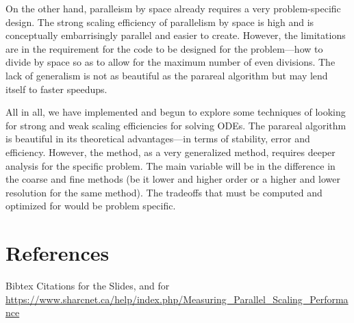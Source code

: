 \documentclass[letterpaper,twocolumn,11pt]{article}
\begin{document}
On the other hand, paralleism by space already requires a very problem-specific
design. The strong scaling efficiency of parallelism by space is high and is
conceptually embarrisingly parallel and easier to create. However, the
limitations are in the requirement for the code to be designed for the
problem---how to divide by space so as to allow for the maximum number of even
divisions. The lack of generalism is not as beautiful as the parareal algorithm
but may lend itself to faster speedups.

All in all, we have implemented and begun to explore some techniques of looking
for strong and weak scaling efficiencies for solving ODEs. The parareal
algorithm is beautiful in its theoretical advantages---in terms of stability,
error and efficiency. However, the method, as a very generalized method,
requires deeper analysis for the specific problem. The main variable will be in
the difference in the coarse and fine methods (be it lower and higher order or a
higher and lower resolution for the same method). The tradeoffs that must be
computed and optimized for would be problem specific.

\section{References}

Bibtex Citations for the Slides, and for \url{https://www.sharcnet.ca/help/index.php/Measuring_Parallel_Scaling_Performance}
\end{document}
